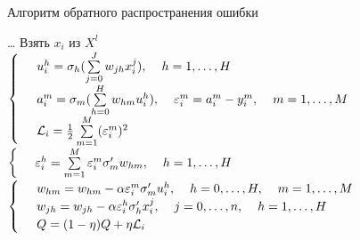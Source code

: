 \documentclass[10pt]{beamer}
\begin{document}
{
\begin{frame}{Алгоритм обратного распространения ошибки}
  \begin{algorithmic}[1]
     \State \dots
       \State Взять $x_i$ из $X^l$
       \pause
       \State 	$\begin{cases}
	\hspace{5mm} u^h_i = \sigma_h (\sum\limits_{j=0}^J w_{jh} x_i^j), \hspace{4mm} h = 1, \dots, H\\
	\hspace{5mm} a^m_i = \sigma_m (\sum\limits_{h=0}^H w_{hm} u_i^h), \hspace{4mm} \varepsilon_i^m = a_i^m - y_i^m, \hspace{4mm} m = 1, \dots, M\\
	\hspace{5mm} \mathcal{L}_i = \frac{1}{2} \sum\limits_{m=1}^M (\varepsilon_i^m)^2\\
	\end{cases}$\\
	\pause
	$\begin{cases} \hspace{5mm} \varepsilon_i^h = \sum\limits_{m=1}^M \varepsilon_i^m \sigma'_m w_{hm}, \hspace{4mm} h = 1, \dots, H\end{cases}$\\
	\pause
	$\begin{cases} \hspace{5mm} w_{hm} = w_{hm} - \alpha \varepsilon_i^m \sigma'_m u_i^h, \hspace{4mm} h = 0, \dots, H, \hspace{4mm} m = 1, \dots, M\\
	\hspace{5mm} w_{jh} = w_{jh} - \alpha \varepsilon_i^h \sigma'_h x_i^j, \hspace{4mm} j = 0, \dots, n, \hspace{4mm} h = 1, \dots, H\\
	\hspace{5mm} Q = (1 - \eta)Q + \eta \mathcal{L}_i \end{cases}$
     \EndRepeat
    \EndFunction
  \end{algorithmic}    
\end{frame}
}
\end{document}
